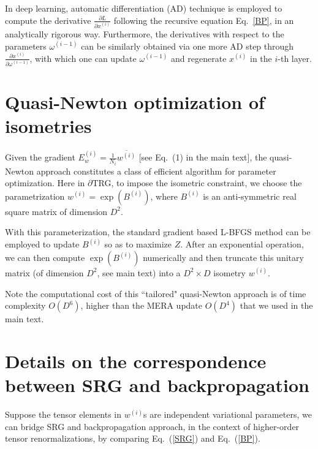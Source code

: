 \documentclass[aps,prx,twocolumn,showpacs,psfig,superscriptaddress,longbibliography]{revtex4-1}
\def\lsb#1{\left(#1\right)}              %
\def\pd#1#2{\frac{\partial{#1}}{\partial{#2}}}
\newcommand{\Eq}[1]{Eq.~\eqref{#1}}
\def\dTRG{$\partial$TRG\xspace}
\begin{document}
In deep learning, automatic differentiation (AD) technique is employed to compute the derivative $\pd{L}{x^{(i)}}$ following the recursive equation \Eq{BP}, in an analytically rigorous way. Furthermore, the derivatives with respect to the parameters $\omega^{(i-1)}$ can be similarly obtained via one more AD step through $\pd{x^{(i)}}{\omega^{(i-1)}}$, with which one can update $\omega^{(i-1)}$ and regenerate $x^{(i)}$ in the $i$-th layer.

\section{Quasi-Newton optimization of isometries}
\label{App:LBFGS}
Given the gradient $E_{w}^{(i)} =\frac{1}{N_i} \overline{w^{(i)}}$ [see Eq.~({\color{blue}1}) in the main text], the quasi-Newton approach constitutes a class of efficient algorithm for parameter optimization. Here in \dTRG, to impose the isometric constraint, we choose the parametrization $w^{(i)} =  \exp{\lsb{B^{(i)}}}$, where $B^{(i)}$ is an anti-symmetric real square matrix of dimension $D^2$. 

With this parameterization, the standard gradient based L-BFGS method \cite{Wright-NO2006} can be employed to update $B^{(i)}$ so as to maximize $Z$. After an exponential operation, we can then compute $\exp{\lsb{B^{(i)}}}$ numerically and then truncate this unitary matrix (of dimension $D^2$, see main text) into a $D^2\times D$ isometry $w^{(i)}$.

Note the computational cost of this ``tailored" quasi-Newton approach  is of time complexity $O(D^6)$, higher than the MERA update $O(D^4)$ that we used in the main text.

\section{Details on the correspondence between SRG and backpropagation}
\label{App:Equiv}
Suppose the tensor elements in $w^{(i)}$s are independent variational parameters, we can bridge SRG and backpropagation approach, in the context of  higher-order tensor renormalizations, by comparing Eq.~(\ref{SRG}) and Eq.~(\ref{BP}). 
\end{document}
